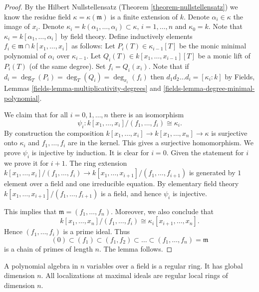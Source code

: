 \begin{proof}
By the Hilbert Nullstellensatz
(Theorem \ref{theorem-nullstellensatz})
we know the residue field $\kappa = \kappa(\mathfrak m)$ is
a finite extension of $k$. Denote $\alpha_i \in \kappa$ the
image of $x_i$. Denote $\kappa_i = k(\alpha_1, \ldots, \alpha_i)
\subset \kappa$, $i = 1, \ldots, n$ and $\kappa_0 = k$.
Note that $\kappa_i = k[\alpha_1, \ldots, \alpha_i]$
by field theory. Define inductively elements
$f_i \in \mathfrak m \cap k[x_1, \ldots, x_i]$
as follows: Let $P_i(T) \in \kappa_{i-1}[T]$
be the monic minimal polynomial of $\alpha_i $ over $\kappa_{i-1}$.
Let $Q_i(T) \in k[x_1, \ldots, x_{i-1}][T]$ be a monic lift of $P_i(T)$
(of the same degree). Set $f_i = Q_i(x_i)$.
Note that if $d_i = \deg_T(P_i) = \deg_T(Q_i) = \deg_{x_i}(f_i)$
then $d_1d_2\ldots d_i = [\kappa_i : k]$ by
Fields, Lemmas \ref{fields-lemma-multiplicativity-degrees} and
\ref{fields-lemma-degree-minimal-polynomial}.

\medskip\noindent
We claim that for all $i = 0, 1, \ldots, n$ there is an
isomorphism
$$
\psi_i : k[x_1, \ldots, x_i] /(f_1, \ldots, f_i) \cong \kappa_i.
$$
By construction the composition
$k[x_1, \ldots, x_i] \to k[x_1, \ldots, x_n] \to \kappa$
is surjective onto $\kappa_i$ and $f_1, \ldots, f_i$ are
in the kernel. This gives a surjective homomorphism.
We prove $\psi_i$ is injective by induction. It is clear for $i = 0$.
Given the statement for $i$ we prove it for $i + 1$.
The ring extension $k[x_1, \ldots, x_i]/(f_1, \ldots, f_i) \to
k[x_1, \ldots, x_{i + 1}]/(f_1, \ldots, f_{i + 1})$
is generated by $1$ element over a field and one
irreducible equation. By elementary field theory
$k[x_1, \ldots, x_{i + 1}]/(f_1, \ldots, f_{i + 1})$
is a field, and hence $\psi_i$ is injective.

\medskip\noindent
This implies that $\mathfrak m = (f_1, \ldots, f_n)$.
Moreover, we also conclude that
$$
k[x_1, \ldots, x_n]/(f_1, \ldots, f_i)
\cong
\kappa_i[x_{i + 1}, \ldots, x_n].
$$
Hence $(f_1, \ldots, f_i)$ is a prime ideal. Thus
$$
(0) \subset (f_1) \subset (f_1, f_2) \subset \ldots \subset
(f_1, \ldots, f_n) = \mathfrak m
$$
is a chain of primes of length $n$. The lemma follows.
\end{proof}

\begin{proposition}
\label{proposition-finite-gl-dim-polynomial-ring}
A polynomial algebra in $n$ variables over a field is a regular ring.
It has global dimension $n$. All localizations at maximal ideals
are regular local rings of dimension $n$.
\end{proposition}

